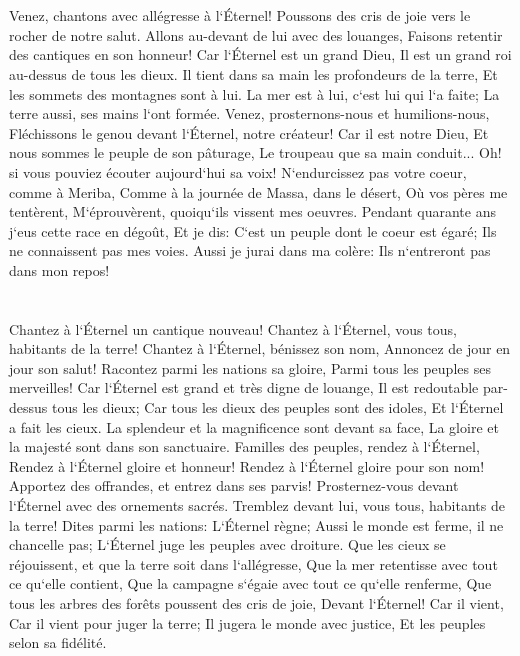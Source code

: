 \chapter{}

\verse Venez, chantons avec allégresse à l`Éternel! Poussons des cris de joie vers le rocher de notre salut. 
\verse Allons au-devant de lui avec des louanges, Faisons retentir des cantiques en son honneur! 
\verse Car l`Éternel est un grand Dieu, Il est un grand roi au-dessus de tous les dieux. 
\verse Il tient dans sa main les profondeurs de la terre, Et les sommets des montagnes sont à lui. 
\verse La mer est à lui, c`est lui qui l`a faite; La terre aussi, ses mains l`ont formée. 
\verse Venez, prosternons-nous et humilions-nous, Fléchissons le genou devant l`Éternel, notre créateur! 
\verse Car il est notre Dieu, Et nous sommes le peuple de son pâturage, Le troupeau que sa main conduit... Oh! si vous pouviez écouter aujourd`hui sa voix! 
\verse N`endurcissez pas votre coeur, comme à Meriba, Comme à la journée de Massa, dans le désert, 
\verse Où vos pères me tentèrent, M`éprouvèrent, quoiqu`ils vissent mes oeuvres. 
\verse Pendant quarante ans j`eus cette race en dégoût, Et je dis: C`est un peuple dont le coeur est égaré; Ils ne connaissent pas mes voies. 
\verse Aussi je jurai dans ma colère: Ils n`entreront pas dans mon repos! 

\chapter{}

\verse Chantez à l`Éternel un cantique nouveau! Chantez à l`Éternel, vous tous, habitants de la terre! 
\verse Chantez à l`Éternel, bénissez son nom, Annoncez de jour en jour son salut! 
\verse Racontez parmi les nations sa gloire, Parmi tous les peuples ses merveilles! 
\verse Car l`Éternel est grand et très digne de louange, Il est redoutable par-dessus tous les dieux; 
\verse Car tous les dieux des peuples sont des idoles, Et l`Éternel a fait les cieux. 
\verse La splendeur et la magnificence sont devant sa face, La gloire et la majesté sont dans son sanctuaire. 
\verse Familles des peuples, rendez à l`Éternel, Rendez à l`Éternel gloire et honneur! 
\verse Rendez à l`Éternel gloire pour son nom! Apportez des offrandes, et entrez dans ses parvis! 
\verse Prosternez-vous devant l`Éternel avec des ornements sacrés. Tremblez devant lui, vous tous, habitants de la terre! 
\verse Dites parmi les nations: L`Éternel règne; Aussi le monde est ferme, il ne chancelle pas; L`Éternel juge les peuples avec droiture. 
\verse Que les cieux se réjouissent, et que la terre soit dans l`allégresse, Que la mer retentisse avec tout ce qu`elle contient, 
\verse Que la campagne s`égaie avec tout ce qu`elle renferme, Que tous les arbres des forêts poussent des cris de joie, 
\verse Devant l`Éternel! Car il vient, Car il vient pour juger la terre; Il jugera le monde avec justice, Et les peuples selon sa fidélité. 

